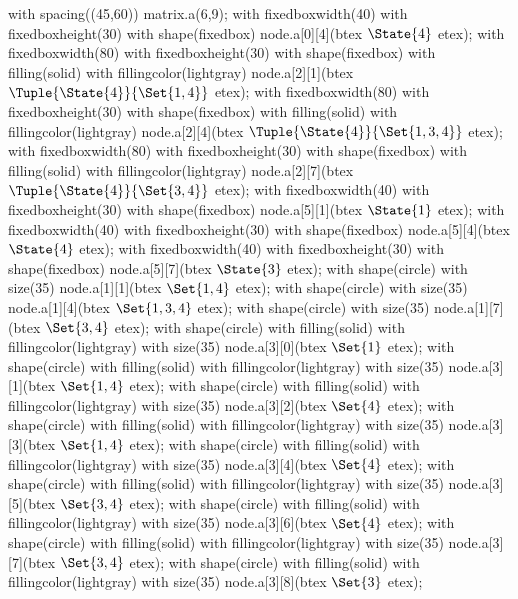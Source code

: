     with spacing((45,60)) matrix.a(6,9);
    with fixedboxwidth(40) with fixedboxheight(30) with shape(fixedbox) node.a[0][4](btex $\State{4}$ etex);
    with fixedboxwidth(80) with fixedboxheight(30) with shape(fixedbox) with filling(solid) with fillingcolor(lightgray) node.a[2][1](btex $\Tuple{\State{4}}{\Set{1, 4}}$ etex);
    with fixedboxwidth(80) with fixedboxheight(30) with shape(fixedbox) with filling(solid) with fillingcolor(lightgray) node.a[2][4](btex $\Tuple{\State{4}}{\Set{1, 3, 4}}$ etex);
    with fixedboxwidth(80) with fixedboxheight(30) with shape(fixedbox) with filling(solid) with fillingcolor(lightgray) node.a[2][7](btex $\Tuple{\State{4}}{\Set{3, 4}}$ etex);
    with fixedboxwidth(40) with fixedboxheight(30) with shape(fixedbox) node.a[5][1](btex $\State{1}$ etex);
    with fixedboxwidth(40) with fixedboxheight(30) with shape(fixedbox) node.a[5][4](btex $\State{4}$ etex);
    with fixedboxwidth(40) with fixedboxheight(30) with shape(fixedbox) node.a[5][7](btex $\State{3}$ etex);
    with shape(circle) with size(35) node.a[1][1](btex \ssd $\Set{1, 4}$ etex);
    with shape(circle) with size(35) node.a[1][4](btex \ssd $\Set{1, 3, 4}$ etex);
    with shape(circle) with size(35) node.a[1][7](btex \ssd $\Set{3, 4}$ etex);
    with shape(circle) with filling(solid) with fillingcolor(lightgray) with size(35) node.a[3][0](btex \ssd $\Set{1}$ etex);
    with shape(circle) with filling(solid) with fillingcolor(lightgray) with size(35) node.a[3][1](btex \ssd $\Set{1, 4}$ etex);
    with shape(circle) with filling(solid) with fillingcolor(lightgray) with size(35) node.a[3][2](btex \ssd $\Set{4}$ etex);
    with shape(circle) with filling(solid) with fillingcolor(lightgray) with size(35) node.a[3][3](btex \ssd $\Set{1, 4}$ etex);
    with shape(circle) with filling(solid) with fillingcolor(lightgray) with size(35) node.a[3][4](btex \ssd $\Set{4}$ etex);
    with shape(circle) with filling(solid) with fillingcolor(lightgray) with size(35) node.a[3][5](btex \ssd $\Set{3, 4}$ etex);
    with shape(circle) with filling(solid) with fillingcolor(lightgray) with size(35) node.a[3][6](btex \ssd $\Set{4}$ etex);
    with shape(circle) with filling(solid) with fillingcolor(lightgray) with size(35) node.a[3][7](btex \ssd $\Set{3, 4}$ etex);
    with shape(circle) with filling(solid) with fillingcolor(lightgray) with size(35) node.a[3][8](btex \ssd $\Set{3}$ etex);
